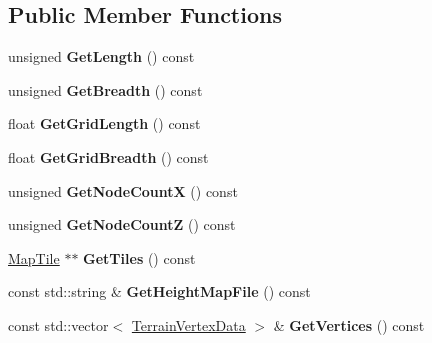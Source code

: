 \subsection*{Public Member Functions}
\begin{DoxyCompactItemize}
\item 
\mbox{\label{classpiolot_1_1_terrain_aeb2f5954d70bc27d7dc84ab15180c502}} 
unsigned {\bfseries Get\+Length} () const
\item 
\mbox{\label{classpiolot_1_1_terrain_a7fa4bf450e2545dbce46a870caa31aa2}} 
unsigned {\bfseries Get\+Breadth} () const
\item 
\mbox{\label{classpiolot_1_1_terrain_aa742fdf411184356e962f98d3785ec7c}} 
float {\bfseries Get\+Grid\+Length} () const
\item 
\mbox{\label{classpiolot_1_1_terrain_acd20433446ca1eef57b1498e26aa0aca}} 
float {\bfseries Get\+Grid\+Breadth} () const
\item 
\mbox{\label{classpiolot_1_1_terrain_a284fb2b373798b73d3893837cfe5d4bc}} 
unsigned {\bfseries Get\+Node\+CountX} () const
\item 
\mbox{\label{classpiolot_1_1_terrain_aef96f5a95563a88c641fbfd299c905f3}} 
unsigned {\bfseries Get\+Node\+CountZ} () const
\item 
\mbox{\label{classpiolot_1_1_terrain_a0366991939da62e46bff441c1b3988e0}} 
\mbox{\hyperlink{classpiolot_1_1_map_tile}{Map\+Tile}} $\ast$$\ast$ {\bfseries Get\+Tiles} () const
\item 
\mbox{\label{classpiolot_1_1_terrain_a8ce0f148b1b05889f609796d09840543}} 
const std\+::string \& {\bfseries Get\+Height\+Map\+File} () const
\item 
\mbox{\label{classpiolot_1_1_terrain_a0fe5987e17e76c418cc9407a1acdc915}} 
const std\+::vector$<$ \mbox{\hyperlink{structpiolot_1_1_terrain_vertex_data}{Terrain\+Vertex\+Data}} $>$ \& {\bfseries Get\+Vertices} () const
\item 
$$
\end{DoxyCompactItemize}
